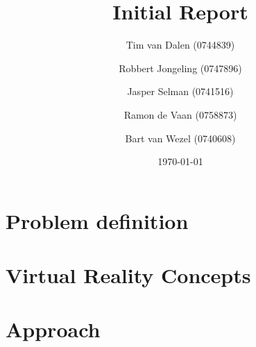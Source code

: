 \documentclass[a4paper,11pt]{article}
\title{
	Initial Report
}
\author{
	Tim van Dalen (0744839)
	\and
	Robbert Jongeling (0747896)
	\and
	Jasper Selman (0741516)
	\and
	Ramon de Vaan (0758873)
	\and
	Bart van Wezel (0740608)
}
\date{\today}
\begin{document}
	\maketitle
	
	\begin{abstract}
		
	\end{abstract}
	
	\section{Problem definition}
	\label{sec:problem}
	
	
	\section{Virtual Reality Concepts}
	\label{sec:vr}
	
	
	\section{Approach}
	\label{sec:approach}
	
	
	
\end{document}

